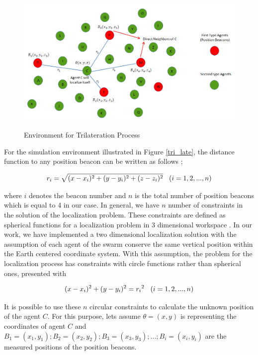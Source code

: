 \begin{figure}[H] 
\caption{Environment for Trilateration Process} \label{tri_late}
\centering
\includegraphics[scale = 0.55]{beacons}
\label{beacons_ref}
\end{figure}

For the simulation environment illustrated in Figure \ref{tri_late}, the distance function to any position beacon can be written as follows \cite{22};

\begin{equation} %
{r_i} = \sqrt{(x-x_i)^2 + (y-y_i)^2+ (z-z_i)^2}    \hspace{0.3cm}   (i=1,2,...,n)
\end{equation}

where $i$ denotes the beacon number and $n$ is the total number of position beacons which is equal to 4 in our case.  In general, we have $n$ number of constraints in the solution of the localization problem. These constraints are defined as spherical functions for a localization problem in 3 dimensional workspace \cite{22}. In our work, we have implemented a two dimensional localization solution with the assumption of each agent of the swarm conserve the same vertical position within the Earth centered coordinate system. With this assumption, the problem for the localization process has constraints with circle functions rather than spherical ones, presented with

\begin{equation}
(x-x_i)^2 + (y - y_i)^2 = {r_i}^2 \hspace{0.3cm}   (i=1,2,...,n)
\end{equation}

It is possible to use these $n$ circular constraints to calculate the unknown position of the agent $C$. For this purpose, lets assume $\theta = (x,y)$ is representing the coordinates of agent $C$ and $B_1 = (x_1,y_1) ; B_2 = (x_2,y_2) ; B_3 = (x_3,y_3) ; ...  ; B_i = (x_i,y_i)$ are the measured positions of the position beacons.

